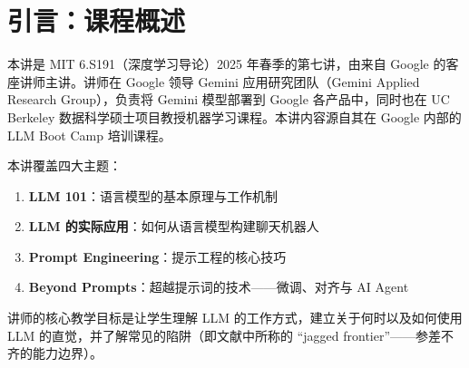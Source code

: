\section{引言：课程概述}

本讲是 MIT 6.S191（深度学习导论）2025 年春季的第七讲，由来自 Google 的客座讲师主讲。讲师在 Google 领导 Gemini 应用研究团队（Gemini Applied Research Group），负责将 Gemini 模型部署到 Google 各产品中，同时也在 UC Berkeley 数据科学硕士项目教授机器学习课程。本讲内容源自其在 Google 内部的 LLM Boot Camp 培训课程。

本讲覆盖四大主题：
\begin{enumerate}
    \item \textbf{LLM 101}：语言模型的基本原理与工作机制
    \item \textbf{LLM 的实际应用}：如何从语言模型构建聊天机器人
    \item \textbf{Prompt Engineering}：提示工程的核心技巧
    \item \textbf{Beyond Prompts}：超越提示词的技术——微调、对齐与 AI Agent
\end{enumerate}

讲师的核心教学目标是让学生理解 LLM 的工作方式，建立关于何时以及如何使用 LLM 的直觉，并了解常见的陷阱（即文献中所称的 ``jagged frontier''——参差不齐的能力边界）。

